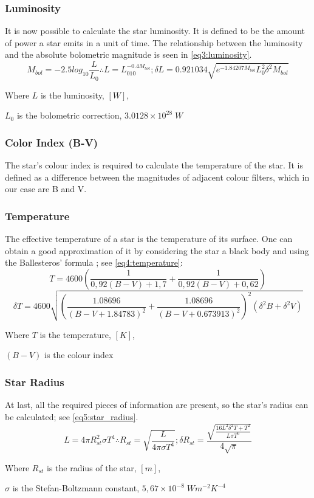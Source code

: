 \documentclass[stu, 11pt, a4paper, floatsintext, noextraspace]{apa7}
\begin{document}
	\subsubsection{Luminosity}
	It is now possible to calculate the star luminosity. It is defined to be the amount of power a star emits in a unit of time. The relationship between the luminosity and the absolute bolometric magnitude is seen in \cref{eq3:luminosity}.
	\begin{equation}
		\label{eq3:luminosity}
		M_{bol}=-2.5log_{10}\frac{L}{L_0} \therefore L=L_010^{-0.4M_{bol}}; \delta L = 0.921034\sqrt{e^{-1.84207M_{bol}}L_0^2\delta^2M_{bol}}
	\end{equation}
	\begin{center}
		Where $L$ is the luminosity, $[W]$,
		
 		$L_0$ is the bolometric correction, $3.0128 \times 10^{28}\;W$
	\end{center}
	\subsubsection{Color Index (B-V)}
	The star's colour index is required to calculate the temperature of the star. It is defined as a difference between the magnitudes of adjacent colour filters, which in our case are B and V.
	\subsubsection{Temperature}
	The effective temperature of a star is the temperature of its surface. One can obtain a good approximation of it  by considering the star a black body and using the Ballesteros' formula \Parencite{alonso_empirical_1996}; see \cref{eq4:temperature}:
	\begin{equation}
		\label{eq4:temperature}
		T=4600\left(\frac{1}{0,92(B-V)+1,7}+\frac{1}{0,92(B-V)+0,62}\right)
	\end{equation}
	\begin{equation*}
		\delta T=4600\sqrt{\left(\frac{1.08696}{(B-V+1.84783)^2} + \frac{1.08696}{(B-V+0.673913)^2}\right)^2\left(\delta^2B+\delta^2V\right)}
	\end{equation*}
	\begin{center}
		Where $T$ is the temperature, $[K]$,
		
 		$(B-V)$ is the colour index
	\end{center}
	\subsubsection{Star Radius}
	At last, all the required pieces of information are present, so the star's radius can be calculated; see \cref{eq5:star_radius}.
	\begin{equation}
		\label{eq5:star_radius}
		L=4\pi R_{st}^2\sigma T^4 \therefore R_{st}=\sqrt{\frac{L}{4\pi\sigma T^4}}; \delta R_{st}=\frac{\sqrt{\frac{16L^2\delta^2T+T^2}{L\sigma T^6}}}{4\sqrt{\pi}}
	\end{equation}
	\begin{center}
		Where $R_{st}$ is the radius of the star, $[m]$,
		
 		$\sigma$ is the Stefan-Boltzmann constant, $5,67\times10^{-8}\;Wm^{-2}K^{-4}$
	\end{center}
\end{document}
